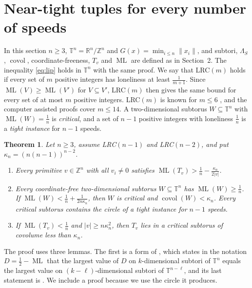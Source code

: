 \documentclass[12pt]{amsart}
\newtheorem{theorem}{Theorem}[section]
\theoremstyle{definition}\newtheorem{definition}[theorem]{Definition}
\theoremstyle{remark}\newtheorem{remark}[theorem]{Remark}
\newcommand{\Z}{\mathbb Z}\newcommand{\R}{\mathbb R}\newcommand{\T}{\mathbb T}
\newcommand{\norm}[1]{\lVert #1\rVert}
\newcommand{\ML}{\operatorname{ML}}
\newcommand{\covol}{\operatorname{covol}}
\newcommand{\eucl}[1]{\lvert #1\rvert}
\begin{document}
\section{Near-tight tuples for every number of speeds}\label{sec:general}
In this section $n\ge3$, $\T^n=\R^n/\Z^n$ and $G(x)=\min_{i\le n}\norm{x_i}$, and subtori, $\Lambda_S$, $\covol$, coordinate-freeness, $T_v$ and $\ML$ are defined as in Section~2. The inequality \eqref{eq:lip} holds in $\T^n$ with the same proof. We say that LRC$(m)$ holds if every set of $m$ positive integers has loneliness at least $\frac1{m+1}$. Since $\ML(V)\ge\ML(V')$ for $V\subseteq V'$, LRC$(m)$ then gives the same bound for every set of at most $m$ positive integers. LRC$(m)$ is known for $m\le6$ \cite{CusickPomerance,Chen,Bienia,BHK,BarajasSerra}, and the computer assisted proofs \cite{Rosenfeld,Trak,SungTrak,Allikvere} cover $m\le14$. A two-dimensional subtorus $W\subseteq\T^n$ with $\ML(W)=\frac1n$ is \emph{critical}, and a set of $n-1$ positive integers with loneliness $\frac1n$ is a \emph{tight instance} for $n-1$ speeds.

\begin{theorem}\label{thm:general}
Let $n\ge3$, assume LRC$(n-1)$ and LRC$(n-2)$, and put $\kappa_n=(n(n-1))^{n-2}$.
\begin{enumerate}[label=\textup{(\roman*)},leftmargin=*]
\item Every primitive $v\in\Z^n$ with all $v_i\ne0$ satisfies $\ML(T_v)>\frac1n-\frac{\kappa_n}{2\eucl v}$.
\item Every coordinate-free two-dimensional subtorus $W\subseteq\T^n$ has $\ML(W)\ge\frac1n$. If $\ML(W)<\frac1n+\frac1{2n\kappa_n}$, then $W$ is critical and $\covol(W)<\kappa_n$. Every critical subtorus contains the circle of a tight instance for $n-1$ speeds.
\item If $\ML(T_v)<\frac1n$ and $\eucl v\ge n\kappa_n^2$, then $T_v$ lies in a critical subtorus of covolume less than $\kappa_n$.
\end{enumerate}
\end{theorem}

The proof uses three lemmas. The first is a form of \cite[Lemma~3.3]{GiriKravitz}, which states in the notation $D=\frac12-\ML$ that the largest value of $D$ on $k$-dimensional subtori of $\T^n$ equals the largest value on $(k-\ell)$-dimensional subtori of $\T^{n-\ell}$, and its last statement is \cite[Lemma~3.3]{Allikvere}. We include a proof because we use the circle it produces.
\end{document}
